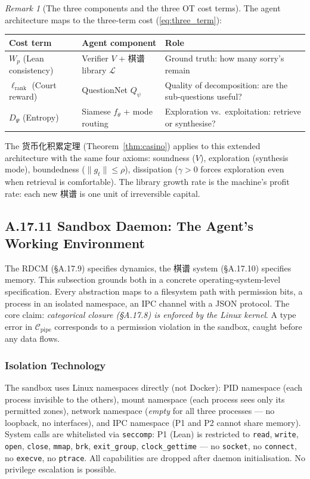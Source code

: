 \documentclass[11pt,a4paper]{article}
\theoremstyle{definition}
\theoremstyle{remark}
\newtheorem{remark}[theorem]{Remark}
\begin{document}
\begin{remark}[The three components and the three OT cost terms]
The agent architecture maps to the three-term cost (\ref{eq:three_term}):
\begin{center}
\small
\begin{tabularx}{\textwidth}{l l X}
\toprule
\textbf{Cost term} & \textbf{Agent component} & \textbf{Role} \\
\midrule
$W_p$ (Lean consistency) & Verifier $V$ + 棋谱 library $\mathcal{L}$ & Ground truth: how many sorry's remain \\
$\ell_{\mathrm{rank}}$ (Court reward) & QuestionNet $Q_\psi$ & Quality of decomposition: are the sub-questions useful? \\
$D_\Psi$ (Entropy) & Siamese $f_\theta$ + mode routing & Exploration vs.\ exploitation: retrieve or synthesise? \\
\bottomrule
\end{tabularx}
\end{center}
The 货币化积累定理 (Theorem~\ref{thm:casino}) applies to this extended architecture with the same four axioms: soundness ($V$), exploration (synthesis mode), boundedness ($\|g_t\| \leq \rho$), dissipation ($\gamma > 0$ forces exploration even when retrieval is comfortable). The library growth rate is the machine's profit rate: each new 棋谱 is one unit of irreversible capital.
\end{remark}


\subsection{A.17.11 Sandbox Daemon: The Agent's Working Environment}

The RDCM (\S A.17.9) specifies dynamics, the 棋谱 system (\S A.17.10) specifies memory. This subsection grounds both in a concrete operating-system-level specification. Every abstraction maps to a filesystem path with permission bits, a process in an isolated namespace, an IPC channel with a JSON protocol. The core claim: \emph{categorical closure (\S A.17.8) is enforced by the Linux kernel}. A type error in $\mathcal{C}_{\mathrm{pipe}}$ corresponds to a permission violation in the sandbox, caught before any data flows.


\subsubsection*{Isolation Technology}

The sandbox uses Linux namespaces directly (not Docker): PID namespace (each process invisible to the others), mount namespace (each process sees only its permitted zones), network namespace (\emph{empty} for all three processes --- no loopback, no interfaces), and IPC namespace (P1 and P2 cannot share memory). System calls are whitelisted via \texttt{seccomp}: P1 (Lean) is restricted to \texttt{read}, \texttt{write}, \texttt{open}, \texttt{close}, \texttt{mmap}, \texttt{brk}, \texttt{exit\_group}, \texttt{clock\_gettime} --- no \texttt{socket}, no \texttt{connect}, no \texttt{execve}, no \texttt{ptrace}. All capabilities are dropped after daemon initialisation. No privilege escalation is possible.
\end{document}

